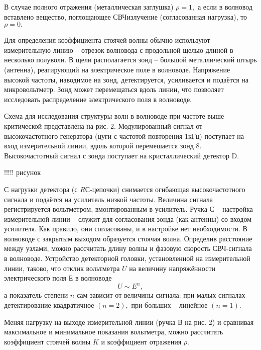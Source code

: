 В случае полного отражения (металлическая заглушка) $\rho=1,$ а если в волновод вставлено вещество, поглощающее СВЧ­излучение (согласованная нагрузка), то $\rho=0.$

Для определения коэффициента стоячей волны обычно используют измерительную линию – отрезок волновода с продольной щелью длиной в несколько полуволн. В щели располагается зонд – большой металлический штырь (антенна), реагирующий на электрическое поле в волноводе. Напряжение высокой частоты, наводимое на зонд, детектируется, усиливается и подаётся на микровольтметр. Зонд может перемещаться вдоль линии, что позволяет исследовать распределение электрического поля в волноводе.


\experiment
Схема для исследования структуры волн в волноводе при частоте выше критической представлена на рис. 2. Модулированный сигнал от высокочастотного генератора (цуги с частотой повторения 1кГц) поступает на вход измерительной линии, вдоль которой перемешается зонд 8. Высокочастотный сигнал с зонда поступает на кристаллический детектор D.

!!!!!
рисунок

С нагрузки детектора (с $RС$-цепочки) снимается огибающая высокочастотного сигнала и подаётся на усилитель низкой частоты. Величина сигнала регистрируется вольтметром, вмонтированным в усилитель. Ручка С – настройка измерительной линии – служит для согласования зонда (как антенны) со входом усилителя. Как правило, они согласованы, и в настройке нет необходимости. В волноводе с закрытым выходом образуется стоячая волна. Определив расстояние между узлами, можно рассчитать длину волны и фазовую скорость СВЧ-сигнала в волноводе. Устройство детекторной головки, установленной на измерительной линии, таково, что отклик вольтметра $U$ на величину напряжённости электрического поля $Е$ в волноводе 
\begin{equation*}
	U\sim E^{n},
\end{equation*}
а показатель степени $n$ сам зависит от величины сигнала: при малых сигналах детектирование квадратичное $(n=2),$ при больших – линейное $(n=1).$

Меняя нагрузку на выходе измерительной линии (ручка В на рис. 2) и сравнивая максимальное и минимальное показания вольтметра, можно рассчитать коэффициент стоячей волны $K$ и коэффициент отражения $\rho.$


